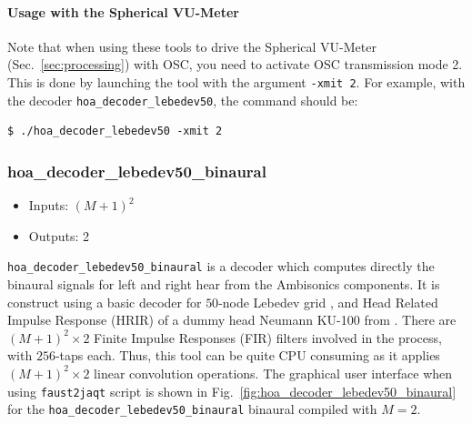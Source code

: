 \documentclass[10pt,a4paper]{article}
\begin{document}
\paragraph{Usage with the Spherical VU-Meter}
Note that when using these tools to drive the Spherical VU-Meter (Sec.~\ref{sec:processing}) with OSC, you need to activate OSC transmission mode 2. This is done by launching the tool with the argument \lstinline'-xmit 2'. For example, with the decoder \lstinline'hoa_decoder_lebedev50', the command should be:
\begin{lstlisting}
$ ./hoa_decoder_lebedev50 -xmit 2
\end{lstlisting}
\pagebreak

\subsubsection{hoa\_decoder\_lebedev50\_binaural}
\begin{itemize}
\item Inputs: $(M+1)^2$
\item Outputs: 2
\end{itemize}
\lstinline'hoa_decoder_lebedev50_binaural' is a decoder which computes directly the binaural signals for left and right hear from the Ambisonics components. It is construct using a basic decoder for $50$-node Lebedev grid \cite{lecomte2015on}, and Head Related Impulse Response (HRIR) of a dummy head Neumann KU-100 from \cite{bernschutz2013spherical}. There are $(M+1)^2 \times 2$ Finite Impulse Responses (FIR) filters involved in the process, with $256$-taps each. Thus, this tool can be quite CPU consuming as it applies  $(M+1)^2 \times 2$ linear convolution operations. The graphical user interface when using \lstinline'faust2jaqt' script is shown in Fig.~\ref{fig:hoa_decoder_lebedev50_binaural} for the \lstinline'hoa_decoder_lebedev50_binaural' binaural compiled with $M=2$.
\end{document}
